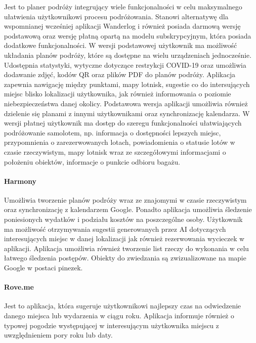 Jest to planer podróży integrujący wiele funkcjonalności w celu maksymalnego ułatwienia użytkownikowi procesu podróżowania. 
Stanowi alternatywę dla wspomnianej wcześniej aplikacji Wanderlog i również posiada darmową wersję podstawową oraz wersję płatną 
opartą na modelu subskrypcyjnym, która posiada dodatkowe funkcjonalności. W wersji podstawowej użytkownik ma możliwość układania 
planów podróży, które są dostępne na wielu urządzeniach jednocześnie. Udostępnia statystyki, wytyczne dotyczące restrykcji COVID-19
oraz umożliwia dodawanie zdjęć, kodów QR oraz plików PDF do planów podróży. Aplikacja zapewnia nawigację między punktami,
mapy lotnisk, sugestie co do intersujących miejsc blisko lokalizacji użytkownika,
jak również informowania o poziomie niebezpieczeństwa danej okolicy. 
Podstawowa wersja aplikacji umożliwia również dzielenie się planami z innymi użytkownikami oraz synchronizację kalendarza. 
W wersji płatnej użytkownik ma dostęp do szeregu funkcjonalności ułatwiających podróżowanie samolotem, np. informacja o dostępności
lepszych miejsc, przypomnienia o zarezerwowanych lotach, powiadomienia o statusie lotów w czasie rzeczywistym, mapy lotnisk wraz
ze szczegółowymi informacjami o położeniu obiektów, informacje o punkcie odbioru bagażu.

\paragraph{Harmony}

Umożliwia tworzenie planów podróży wraz ze znajomymi w czasie rzeczywistym oraz synchronizację z kalendarzem Google.
Ponadto aplikacja umożliwia śledzenie poniesionych wydatków i podziału kosztów na poszczególne osoby. 
Użytkownik ma możliwość otrzymywania sugestii generowanych przez AI dotyczących interesujących miejsc w danej lokalizacji 
jak również rezerwowania wycieczek w aplikacji. Aplikacja umożliwia również tworzenie list rzeczy do wykonania w
celu łatwego śledzenia postępów. Obiekty do zwiedzania są zwizualizowane na mapie Google w postaci pinezek.

\paragraph{Rove.me}

Jest to aplikacja, która sugeruje użytkownikowi najlepszy czas na odwiedzenie danego miejsca lub wydarzenia w ciągu roku. 
Aplikacja informuje również o typowej pogodzie występującej w interesującym użytkownika miejscu z uwzględnieniem pory roku lub daty.

